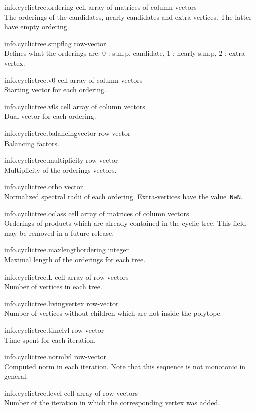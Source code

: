 \begin{param}
\item[info.cyclictree.ordering] cell array of matrices of column vectors\\The orderings of the candidates, nearly-candidates and extra-vertices. The latter have empty ordering.
\item[info.cyclictree.smpflag] row-vector\\Defines what the orderings are: $0$ : s.m.p.-candidate, $1$ : nearly-s.m.p, $2$ : extra-vertex.
\item[info.cyclictree.v0] cell array of column vectors\\Starting vector for each ordering.
\item[info.cyclictree.v0s] cell array of column vectors\\Dual vector for each ordering.
\item[info.cyclictree.balancingvector] row-vector\\Balancing factors.
\item[info.cyclictree.multiplicity] row-vector\\Multiplicity of the orderings vectors.
\item[info.cyclictree.orho] vector\\Normalized spectral radii of each ordering. Extra-vertices have the value~\texttt{NaN}.
\item[info.cyclictree.oclass] cell array of matrices of column vectors\\Orderings of products which are already contained in the cyclic tree. This field may be removed in a future release.
\item[info.cyclictree.maxlengthordering] integer\\Maximal length of the orderings for each tree.
\item[info.cyclictree.L] cell array of row-vectors\\Number of vertices in each tree.
\item[info.cyclictree.livingvertex] row-vector\\Number of vertices without children which are not inside the polytope.
\item[info.cyclictree.timelvl] row-vector\\Time spent for each iteration.
\item[info.cyclictree.normlvl] row-vector\\Computed norm in each iteration. Note that this sequence is not monotonic in general.
\item[info.cyclictree.level] cell array of row-vectors\\Number of the iteration in which the corresponding vertex was added.

\end{param}
